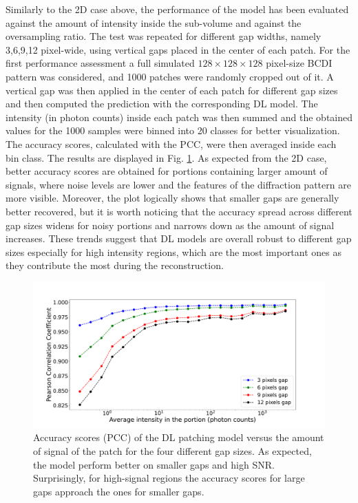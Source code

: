 Similarly to the 2D case above, the performance of the model has been evaluated against the amount of intensity 
inside the sub-volume and against the oversampling ratio. The test was repeated for different gap widths, namely 3,6,9,12 
pixel-wide, using vertical gaps placed in the center of each patch. 
For the first performance assessment a full simulated $128\times128\times128$ pixel-size BCDI pattern was considered, 
and 1000 patches were randomly cropped out of it. A vertical gap was then applied in the center of each patch for different 
gap sizes and then computed the prediction with the corresponding DL model. The intensity (in photon counts) inside each patch 
was then summed and the obtained values for the 1000 samples were binned into 20 classes for better visualization. 
The accuracy scores, calculated with the PCC, were then averaged inside each bin class. The results are displayed in Fig. 
\ref{fig:acc_int_3D}. As expected from the 2D case, better accuracy scores are obtained for portions
containing larger amount of signals, where noise levels are lower and the features of the diffraction pattern are more 
visible. Moreover, the plot logically shows that smaller gaps are generally better recovered, but it is worth noticing
that the accuracy spread across different gap sizes widens for noisy portions and narrows down as the amount of signal 
increases. These trends suggest that DL models are overall robust to different gap sizes especially for high intensity regions, 
which are the most important ones as they contribute the most during the reconstruction. 

\begin{figure}[H]
    \centering
    \includegraphics[width=\textwidth]{figures/Inpainting/1D_Acc_Intensity.pdf}
    \caption{Accuracy scores (PCC) of the DL patching model versus the amount of signal of the patch for the four different 
    gap sizes. As expected, the model perform better on smaller gaps and high SNR. Surprisingly, for high-signal regions 
    the accuracy scores for large gaps approach the ones for smaller gaps.}
    \label{fig:acc_int_3D}
\end{figure}

